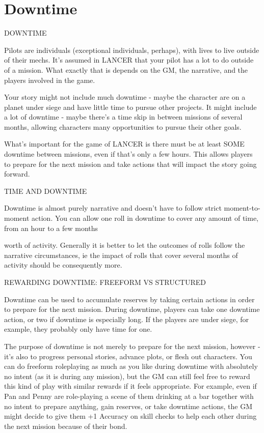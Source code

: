 \chapter{Downtime}
                                             DOWNTIME


Pilots are individuals (exceptional individuals, perhaps), with lives to live outside of their mechs.
It’s assumed in LANCER that your pilot has a lot to do outside of a mission. What exactly that is
depends on the GM, the narrative, and the players involved in the game.


Your story might not include much downtime - maybe the character are on a planet under siege
and have little time to pursue other projects. It might include a lot of downtime - maybe there’s a
time skip in between missions of several months, allowing characters many opportunities to
pursue their other goals.


What’s important for the game of LANCER is there must be at least SOME downtime between
missions, even if that’s only a few hours. This allows players to prepare for the next mission and
take actions that will impact the story going forward.


                                           TIME AND DOWNTIME


Downtime is almost purely narrative and doesn’t have to follow strict moment-to-moment action.
You can allow one roll in downtime to cover any amount of time, from an hour to a few months




worth of activity. Generally it is better to let the outcomes of rolls follow the narrative
circumstances, ie the impact of rolls that cover several months of activity should be
consequently more.


                      REWARDING DOWNTIME: FREEFORM VS STRUCTURED


Downtime can be used to accumulate reserves by taking certain actions in order to prepare for
the next mission. During downtime, players can take one downtime action, or two if downtime is
especially long. If the players are under siege, for example, they probably only have time for one.


The purpose of downtime is not merely to prepare for the next mission, however - it’s also to
progress personal stories, advance plots, or flesh out characters. You can do freeform
roleplaying as much as you like during downtime with absolutely no intent (as it is during any
mission), but the GM can still feel free to reward this kind of play with similar rewards if it
feels appropriate. For example, even if Pan and Penny are role-playing a scene of them drinking
at a bar together with no intent to prepare anything, gain reserves, or take downtime actions, the
GM might decide to give them +1 Accuracy on skill checks to help each other during the next
mission because of their bond.


